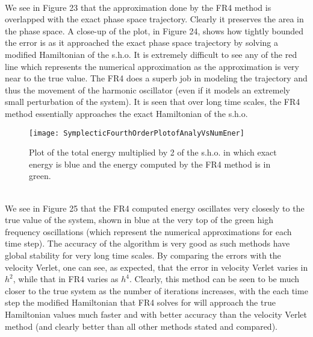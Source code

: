 \documentclass[12pt]{article}
\begin{document}
\\\indent We see in Figure 23 that the approximation done by the FR4 method is overlapped with the exact phase space trajectory. Clearly it preserves the area in the phase space. A close-up of the plot, in Figure 24, shows how tightly bounded the error is as it approached the exact phase space trajectory by solving a modified Hamiltonian of the s.h.o. It is extremely difficult to see any of the red line which represents the numerical approximation as the approximation is very near to the true value. The FR4 does a superb job in modeling the trajectory and thus the movement of the harmonic oscillator (even if it models an extremely small perturbation of the system). It is seen that over long time scales, the FR4 method essentially approaches the exact Hamiltonian of the s.h.o.
\begin{figure}[h!]
\centering
\texttt{[image: SymplecticFourthOrderPlotofAnalyVsNumEner]}
\caption{Plot of the total energy multiplied by 2 of the s.h.o. in which exact energy is blue and the energy computed by the FR4 method is in green.}
\end{figure}
\\\indent We see in Figure 25 that the FR4 computed energy oscillates very closesly to the true value of the system, shown in blue at the very top of the green high frequency oscillations (which represent the numerical approximations for each time step). The accuracy of the algorithm is very good as such methods have global stability for very long time scales. By comparing the errors with the velocity Verlet, one can see, as expected, that the error in velocity Verlet varies in ${h}^{2}$, while that in FR4 varies as ${h}^{4}$. Clearly, this method can be seen to be much closer to the true system as the number of iterations increases, with the each time step the modified Hamiltonian that FR4 solves for will approach the true Hamiltonian values much faster and with better accuracy than the velocity Verlet method (and clearly better than all other methods stated and compared). 
\end{document}

